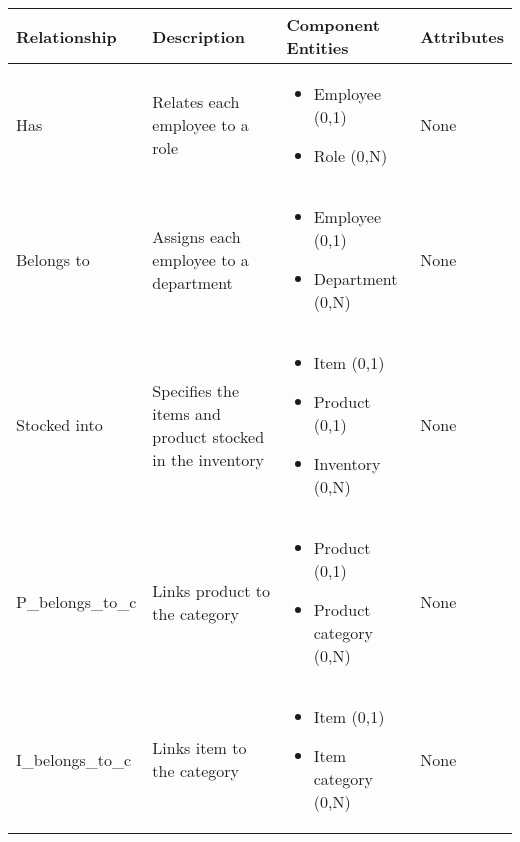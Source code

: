 \begin{longtable}{|p{}|p{} |p{}|p{} |} 
\hline
\textbf{Relationship} & \textbf{Description} & \textbf{Component Entities} & \textbf{Attributes} \\\hline


Has & Relates each employee to a role & \begin{itemize}
        \vspace{-1em}
        \item Employee (0,1)
        \item Role (0,N)
    \end{itemize}
 &  None \\\hline
 
Belongs to & Assigns each employee to a department & \begin{itemize}
        \vspace{-1em}
        \item Employee (0,1)
        \item Department (0,N)
    \end{itemize}
 &  None \\\hline

Stocked into & Specifies the items and product stocked in the inventory & \begin{itemize}
	\vspace{-1em}
	\item Item (0,1)
	\item Product (0,1)
	\item Inventory (0,N)
\end{itemize}
&  None \\\hline

P\_belongs\_to\_c & Links product to the category  & \begin{itemize}
	\vspace{-1em}
	\item Product (0,1)
	\item Product category (0,N)
\end{itemize}
&  None \\\hline
I\_belongs\_to\_c & Links item to the category & \begin{itemize}
	\vspace{-1em}
	\item Item (0,1)
	\item Item category (0,N)
\end{itemize}
&  None \\\hline


\end{longtable}
